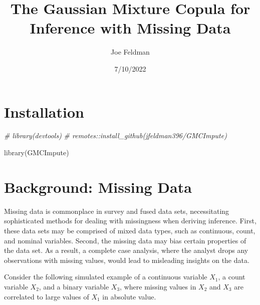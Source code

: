 \documentclass[
]{article}
\title{The Gaussian Mixture Copula for Inference with Missing Data}
\author{Joe Feldman}
\date{7/10/2022}
\newenvironment{Shaded}{\begin{snugshade}}{\end{snugshade}}
\newcommand{\CommentTok}[1]{\textcolor[rgb]{0.56,0.35,0.01}{\textit{#1}}}
\newcommand{\FunctionTok}[1]{\textcolor[rgb]{0.00,0.00,0.00}{#1}}
\newcommand{\NormalTok}[1]{#1}
\begin{document}
\maketitle

\hypertarget{installation}{%
\section{Installation}\label{installation}}

\begin{Shaded}
\begin{Highlighting}[]
\CommentTok{\# library(devtools)}
\CommentTok{\# remotes::install\_github(\textquotesingle{}jfeldman396/GMCImpute\textquotesingle{})}

\FunctionTok{library}\NormalTok{(GMCImpute)}
\end{Highlighting}
\end{Shaded}

\hypertarget{background-missing-data}{%
\section{Background: Missing Data}\label{background-missing-data}}

Missing data is commonplace in survey and fused data sets, necessitating
sophisticated methods for dealing with missingness when deriving
inference. First, these data sets may be comprised of mixed data types,
such as continuous, count, and nominal variables. Second, the missing
data may bias certain properties of the data set. As a result, a
complete case analysis, where the analyst drops any observations with
missing values, would lead to misleading insights on the data.

Consider the following simulated example of a continuous variable
\(X_{1}\), a count variable \(X_{2}\), and a binary variable \(X_{3}\),
where missing values in \(X_{2}\) and \(X_{3}\) are correlated to large
values of \(X_{1}\) in absolute value.
\end{document}
